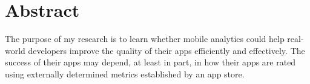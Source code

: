 \chapter*{Abstract}
\begin{SingleSpace}
The purpose of my research is to learn whether mobile analytics could help
real-world developers improve the quality of their apps efficiently and effectively. The success of their apps may depend, at least in part, in how their apps are rated using externally determined metrics established by an app store.
%
%


\end{SingleSpace}
